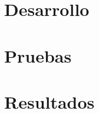
\section{Desarrollo} %
\label{sec:desarrollo}


\section{Pruebas} %
\label{sec:pruebas}


\section{Resultados} %
\label{sec:resultados}


